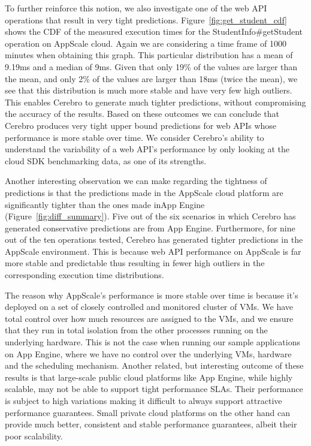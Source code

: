To further reinforce this notion, we also investigate one of the web API operations that result in very tight predictions. 
Figure~\ref{fig:get_student_cdf} shows the CDF of the measured execution times for the StudentInfo\#getStudent operation on
AppScale cloud. Again we are considering a time frame of 1000 minutes when obtaining this graph.
This particular distribution has a mean of 9.19ms and a median of 9ms. Given that only 19\% of the values are larger than the mean, 
and only 2\% of the values are larger than 18ms (twice the mean), 
we see that this distribution is much more stable and have very few high outliers. This enables Cerebro to generate much
tighter predictions, without compromising the accuracy of the results. Based on these outcomes we can conclude that Cerebro produces
very tight upper bound predictions for web APIs whose performance is more stable over time. %
We consider Cerebro's ability to understand the variability of a web API's performance by only looking at the cloud SDK
benchmarking data, as one of its strengths.

Another interesting observation we can make regarding the tightness of predictions is that 
the predictions made in the AppScale cloud platform are significantly tighter than the ones made inApp Engine (Figure~\ref{fig:diff_summary}). 
Five out of the six scenarios in which Cerebro has generated conservative predictions are from App Engine. Furthermore,
for nine out of the ten operations tested, Cerebro has generated tighter predictions in the AppScale environment. This is 
because web API performance on AppScale is far more stable and predictable thus resulting in fewer high outliers in the corresponding
execution time distributions.

The reason why AppScale's performance is more stable over time is because it's deployed on a set of closely controlled 
and monitored cluster of VMs. We have total control
over how much resources are assigned to the VMs, and we ensure that they run in total isolation from the other processes 
running on the underlying hardware.
This is not the case when running our sample applications on App Engine, where we have no control over 
the underlying VMs, hardware and the
scheduling mechanism. Another related, but interesting outcome of these results is that large-scale public cloud platforms like App Engine, while
highly scalable, may not be able to support tight performance SLAs. Their performance is subject to high variations making it difficult to always support attractive
performance guarantees. Small private cloud platforms on the other hand can provide much better, consistent and stable performance guarantees, albeit their
poor scalability. %

